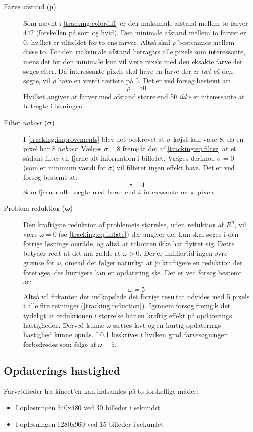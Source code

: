 \begin{description}
\item[Farve afstand (${\boldsymbol{\rho}}$)]
Som nævnt i \cref{tracking:colordiff} er den maksimale afstand mellem to farver 442 (forskellen på sort og hvid).
Den minimale afstand mellem to farver er 0, hvilket er tilfældet for to ens farver.
Altså skal $\rho$ bestemmes mellem disse to.
For den maksimale afstand betragtes alle pixels som interessante, mens det for den minimale kun vil være pixels med den eksakte farve der søges efter.
Da interessante pixels skal have en farve der er \emph{tæt på} den søgte, vil $\rho$ have en værdi tættere på 0.
Det er ved forsøg bestemt at:
$$\rho = 50$$
Hvilket angiver at farver med afstand større end 50 \emph{ikke} er interessante at betragte i løsningen.

\item[Filter \textit{naboer} ($\boldsymbol{\sigma}$)]
I \cref{tracking:improvements} blev det beskrevet at $\sigma$ højst kan være 8, da en pixel har 8 \emph{naboer}.
Vælges $\sigma = 8$ fremgår det af \cref{tracking:eq:filter} at et sådant filter vil fjerne alt information i billedet.
Vælges derimod $\sigma = 0$ (som er minimum værdi for $\sigma$) vil filteret ingen effekt have.
Det er ved forsøg bestemt at:
$$\sigma = 4$$
Som fjerner alle vægte med færre end 4 interessante nabo-pixels.

\item[Problem reduktion ($\boldsymbol{\omega}$)]
Den kraftigste reduktion af problemets størrelse, uden reduktion af $R^n$, vil være $\omega = 0$ (se \cref{tracking:eq:inflate}) der angiver der kun skal søges i den forrige løsnings område, og altså at robotten ikke har flyttet sig.
Dette betyder reelt at det må gælde at $\omega > 0$.
Der er imidlertid ingen øvre grænse for $\omega$, omend det følger naturligt at jo kraftigere en reduktion der foretages, des hurtigere kan en opdatering ske.
Det er ved forsøg bestemt at:
$$\omega = 5$$
Altså vil firkanten der indkapslede det forrige resultat udvides med 5 pixels i alle fire retninger (\cref{tracking:reduction}).
Igennem forsøg fremgik det tydeligt at reduktionen i størrelse har en kraftig effekt på opdaterings hastigheden.
Derved kunne $\omega$ sættes lavt og en hurtig opdaterings hastighed kunne opnås.
I \cref{tracking:updatespeed} beskrives i hvilken grad farvesøgningen forbedredes som følge af $\omega = 5$.
\end{description}

\subsection{Opdaterings hastighed}\label{tracking:updatespeed}
Farvebilleder fra kinect'en kan indsamles på to forskellige måder:
\begin{itemize}
\item I opløsningen 640x480 ved 30 billeder i sekundet
\item I opløsningen 1280x960 ved 15 billeder i sekundet
\end{itemize}

